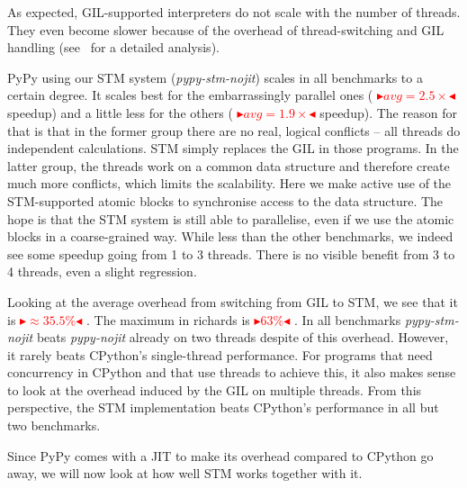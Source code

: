 \documentclass{sigplanconf}
\newcommand{\mynote}[2]{%
  \textcolor{red}{%
    \fbox{\bfseries\sffamily\scriptsize#1}%
    {\small$\blacktriangleright$\textsf{\emph{#2}}$\blacktriangleleft$}%
  }%
}
\newcommand\remi[1]{\mynote{Remi}{#1}}
\begin{document}
As expected, GIL-supported interpreters do not scale with the number
of threads. They even become slower because of the overhead of
thread-switching and GIL handling (see~\cite{beazley10} for a detailed
analysis).

PyPy using our STM system (\emph{pypy-stm-nojit}) scales in all
benchmarks to a certain degree. It scales best for the embarrassingly
parallel ones (\remi{$avg=2.5\times$} speedup) and a little less for
the others (\remi{$avg=1.9\times$} speedup). The reason for that is
that in the former group there are no real, logical conflicts -- all
threads do independent calculations. STM simply replaces the GIL in
those programs. In the latter group, the threads work on a common data
structure and therefore create much more conflicts, which limits the
scalability. Here we make active use of the STM-supported atomic
blocks to synchronise access to the data structure. The hope
is that the STM system is still able to parallelise, even if we use
the atomic blocks in a coarse-grained way. While less than the other
benchmarks, we indeed see some speedup going from 1 to 3 threads.
There is no visible benefit from 3 to 4 threads, even a slight
regression.

Looking at the average overhead from switching from GIL to STM, we see
that it is \remi{$\approx 35.5\%$}. The maximum in richards is
\remi{$63\%$}. In all benchmarks \emph{pypy-stm-nojit} beats
\emph{pypy-nojit} already on two threads despite of this overhead.
However, it rarely beats CPython's single-thread performance.  For
programs that need concurrency in CPython and that use threads to
achieve this, it also makes sense to look at the overhead induced by
the GIL on multiple threads. From this perspective, the STM
implementation beats CPython's performance in all but two benchmarks.

Since PyPy comes with a JIT to make its overhead compared to CPython
go away, we will now look at how well STM works together with it.
\end{document}

